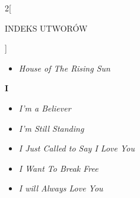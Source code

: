 \documentclass[a4paper]{report}
\begin{document}
\begin{multicols*}{2}[\begin{Huge}INDEKS UTWORÓW\end{Huge}\vspace{1cm}]
\begin{minipage}{\columnwidth}
\begin{itemize}[topsep=6pt, after=\vspace{5mm}, leftmargin=0mm]
		\item[]  \textit{House of The Rising Sun}  \\
	\end{itemize}
\end{minipage}
\begin{minipage}{\columnwidth}
\begin{Large}
		\textbf{I}
	\end{Large} 
	\begin{itemize}[topsep=6pt, after=\vspace{1.5mm}, leftmargin=0mm]
		\itemsep0em
		\item[]\textit{I'm a Believer}  \\
		\item[]  \textit{I'm Still Standing}  \\
	\end{itemize}
\end{minipage}
\begin{minipage}{\columnwidth}
	\begin{itemize}[topsep=6pt, after=\vspace{1.5mm}, leftmargin=0mm]
		\itemsep0em
		\item[]  \textit{I Just Called to Say I Love You}  \\
	\end{itemize}
\end{minipage}
\begin{minipage}{\columnwidth}
	\begin{itemize}[topsep=6pt, after=\vspace{1.5mm}, leftmargin=0mm]
		\itemsep0em
		\item[]  \textit{I Want To Break Free}  \\
	\end{itemize}
\end{minipage}
\begin{minipage}{\columnwidth}
	\begin{itemize}[topsep=6pt, after=\vspace{1.5mm}, leftmargin=0mm]
		\itemsep0em
		\item[]  \textit{I will Always Love You}  \\
	\end{itemize}
\end{minipage}
\begin{minipage}{\columnwidth}
	\begin{itemize}[topsep=6pt, after=\vspace{1.5mm}, leftmargin=0mm]

\end{itemize}
\end{minipage}
\end{multicols*}
\end{document}
